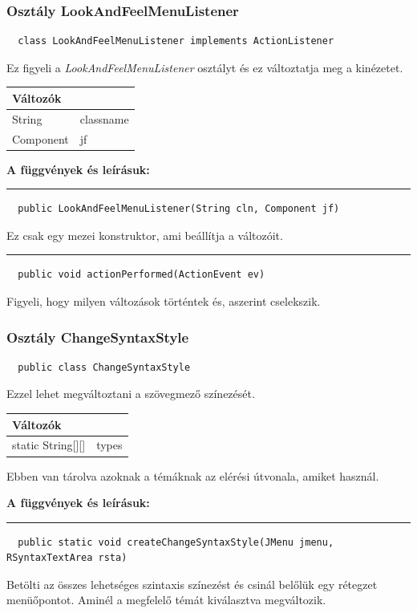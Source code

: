 \documentclass[12pt]{article}
\newcommand{\fuggveny}{\textbf{A függvények és leírásuk: \\}}
\newcommand{\vonal}{\noindent\rule{\textwidth}{1pt}}
\begin{document}
\subsubsection*{Osztály LookAndFeelMenuListener}
\begin{lstlisting}
  class LookAndFeelMenuListener implements ActionListener
\end{lstlisting}
Ez figyeli a \textit{LookAndFeelMenuListener} osztályt és ez
változtatja meg a kinézetet.

\begin{longtable}{|p{5cm}|p{10cm}|} \hline
    \multicolumn{2}{|p{15cm}|}{\textbf{Változók}}  \\ \hline
    String & classname \\ \hline
    Component & jf \\ \hline
\end{longtable}

\newpage
\fuggveny
\vonal
\begin{lstlisting}
  public LookAndFeelMenuListener(String cln, Component jf)
\end{lstlisting}
Ez csak egy mezei konstruktor, ami beállítja a változóit.

\vonal
\begin{lstlisting}
  public void actionPerformed(ActionEvent ev)
\end{lstlisting}
Figyeli, hogy milyen változások történtek és, aszerint cselekszik.

\subsubsection*{Osztály ChangeSyntaxStyle}
\begin{lstlisting}
  public class ChangeSyntaxStyle
\end{lstlisting}
Ezzel lehet megváltoztani a szövegmező színezését.

\begin{longtable}{|p{5cm}|p{10cm}|} \hline
    \multicolumn{2}{|p{15cm}|}{\textbf{Változók}}  \\ \hline
    static String[][] & types \\ \hline
\end{longtable}
Ebben van tárolva azoknak a témáknak az elérési útvonala, amiket használ.

\fuggveny
\vonal
\begin{lstlisting}
  public static void createChangeSyntaxStyle(JMenu jmenu, RSyntaxTextArea rsta)
\end{lstlisting}
Betölti az összes lehetséges szintaxis színezést és csinál belőlük egy rétegzet
menüőpontot. Aminél a megfelelő témát kiválasztva megváltozik.
\end{document}
